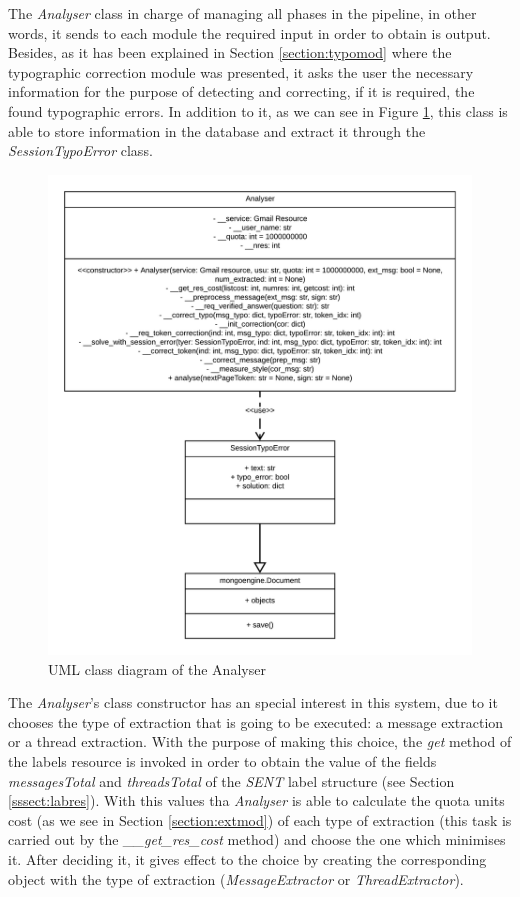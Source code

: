 The \textit{Analyser} class in charge of managing all phases in the pipeline, in other words, it sends to each module the required input in order to obtain is output. Besides, as it has been explained in Section \ref{section:typomod} where the typographic correction module was presented, it asks the user the necessary information for the purpose of detecting and correcting, if it is required, the found typographic errors. In addition to it, as we can see in Figure \ref{fig:umlanalyser}, this class is able to store information in the database and extract it through the \textit{SessionTypoError} class.

\begin{figure}[h]
	\centering%
	\centerline{\includegraphics[width=0.6\paperwidth]{Imagenes/Bitmap/Analyser/analyserUML.png}}%
	\caption{UML class diagram of the Analyser}%
	\label{fig:umlanalyser}
\end{figure}

The \textit{Analyser}'s class constructor has an special interest in this system, due to it chooses the type of extraction that is going to be executed: a message extraction or a thread extraction. With the purpose of making this choice, the \textit{get} method of the labels resource is invoked in order to obtain the value of the fields \textit{messagesTotal} and \textit{threadsTotal} of the \textit{SENT} label structure (see Section \ref{sssect:labres}). With this values tha \textit{Analyser} is able to calculate the quota units cost (as we see in Section \ref{section:extmod}) of each type of extraction (this task is carried out by the \textit{\_\_get\_res\_cost} method) and choose the one which minimises it. After deciding it, it gives effect to the choice by creating the corresponding object with the type of extraction (\textit{MessageExtractor} or \textit{ThreadExtractor}).

